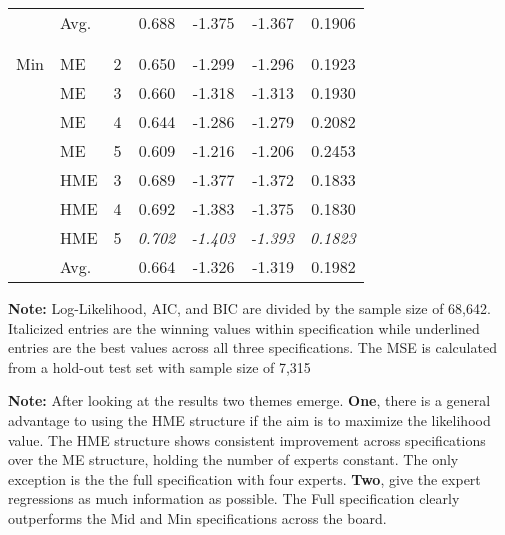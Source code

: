 \documentclass[12pt]{article}
\theoremstyle{definition}
\begin{document}
\begin{table}[b!]
\begin{threeparttable}
{\begin{tabular}[r]{l l l r r r r}
         \cmidrule(l){2-7}
         &  Avg. &         & 0.688      & -1.375      & -1.367      & 0.1906      \\
         \cmidrule(l){2-7}
         &       &         &            &             &             &             \\
         &       &         &            &             &             &             \\
Min      &  ME   &    2    & 0.650      & -1.299      & -1.296      & 0.1923      \\
         &  ME   &    3    & 0.660      & -1.318      & -1.313      & 0.1930      \\
         &  ME   &    4    & 0.644      & -1.286      & -1.279      & 0.2082      \\
         &  ME   &    5    & 0.609      & -1.216      & -1.206      & 0.2453      \\
         &  HME  &    3    & 0.689      & -1.377      & -1.372      & 0.1833      \\
         &  HME  &    4    & 0.692      & -1.383      & -1.375      & 0.1830      \\
         &  HME  &    5    & \it{0.702} & \it{-1.403} & \it{-1.393} & \it{0.1823} \\
         \cmidrule(l){2-7}
         &  Avg. &         & 0.664      & -1.326      & -1.319      & 0.1982      \\
        \cmidrule(l){1-7}
    \end{tabular}
    }
    \begin{tablenotes}
      \item{\footnotesize \textbf{Note:} Log-Likelihood, AIC, and BIC are divided by the sample size of 68,642.
      Italicized entries are the winning values within specification while underlined entries are the best values across all three specifications.
      The MSE is calculated from a hold-out test set with sample size of 7,315}
      \item{\footnotesize \textbf{Note:} After looking at the results two themes emerge. \textbf{One}, there is a general advantage to using the HME structure if the aim is to maximize the likelihood value.
      The HME structure shows consistent improvement across specifications over the ME structure, holding the number of experts constant. The only exception is the the full specification with four experts.
      \textbf{Two}, give the expert regressions as much information as possible. The Full specification clearly outperforms the Mid and Min specifications across the board.
      }
      \item{\footnotesize }
    \end{tablenotes} \label{tbl:model_comparison}
  \end{threeparttable}
\end{table}
\end{document}
